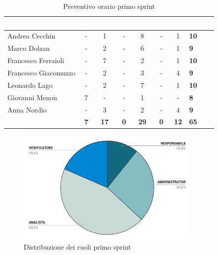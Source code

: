 {
\setlength{\tabcolsep}{10pt}
\renewcommand{\arraystretch}{1.5}
\begin{table}[h!]
    \centering
    \begin{tabularx}{\textwidth}{| l | c | c | c | c | c | c | X |}
        \hline
        \rowcolor{headerrow} \textbf{\textcolor{white}{Membro}} & \textbf{\textcolor{white}{R.}} & \textbf{\textcolor{white}{Am.}} & \textbf{\textcolor{white}{Pj.}} & \textbf{\textcolor{white}{An.}} & \textbf{\textcolor{white}{Pg.}} & \textbf{\textcolor{white}{V.}} & \textbf{\textcolor{white}{Totale}} \\
        \hline
        Andrea Cecchin & - & 1 & - & 8 & - & 1 & \textbf{10} \\
        \hline
        Marco Dolzan & - & 2 & - & 6 & - & 1 & \textbf{9} \\
        \hline
        Francesco Ferraioli & - & 7 & - & 2 & - & 1 & \textbf{10} \\
        \hline  
        Francesco Giacomuzzo & - & 2 & - & 3 & - & 4 & \textbf{9} \\
        \hline
        Leonardo Lago & - & 2 & - & 7 & - & 1 & \textbf{10} \\
        \hline
        Giovanni Menon & 7 & - & - & 1 & - & - & \textbf{8} \\
        \hline
        Anna Nordio & - & 3 & - & 2 & - & 4 & \textbf{9} \\
        \hline
    \cellcolor{headerrow} \textbf{\textcolor{white}{Totale}} & \textbf{7} & \textbf{17} & \textbf{0} & \textbf{29} & \textbf{0} & \textbf{12} & \textbf{65} \\
        \hline
    \end{tabularx} 
    \caption{Preventivo orario primo sprint}
    \label{tab:preventivoorarioprimosprint}
\end{table}
}

\begin{figure}[h!]
    \centering
    \includegraphics[width=0.8\textwidth]{prev1ruoli.png}
    \caption{Distribuzione dei ruoli primo sprint}
    \label{fig:preventivoorarioprimosprint}
\end{figure}


